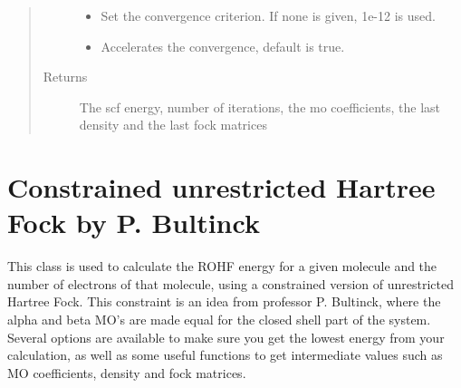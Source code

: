 \documentclass[letterpaper,10pt,english]{sphinxmanual}
\begin{document}
\begin{fulllineitems}
\begin{fulllineitems}
\begin{quote}
\begin{description}
\begin{itemize}
\item {} 
 \textendash{} Set the convergence criterion. If none is given, 1e-12 is used.

\item {} 
 \textendash{} Accelerates the convergence, default is true.

\end{itemize}

\item[{Returns}] \leavevmode
The scf energy, number of iterations, the mo coefficients, the last density and the last fock matrices

\end{description}\end{quote}

\end{fulllineitems}


\end{fulllineitems}

\label{\detokenize{cUHF_b:module-hf.HartreeFock.cUHF_b}}

\chapter{Constrained unrestricted Hartree Fock by P. Bultinck}
\label{\detokenize{cUHF_b:constrained-unrestricted-hartree-fock-by-p-bultinck}}\label{\detokenize{cUHF_b::doc}}
This class is used to calculate the ROHF energy for a given molecule and the number of electrons of that molecule,
using a constrained version of unrestricted Hartree Fock. This constraint is an idea from professor P. Bultinck, where
the alpha and beta MO’s are made equal for the closed shell part of the system.
Several options are available to make sure you get the lowest energy from your calculation, as well as some useful
functions to get intermediate values such as MO coefficients, density and fock matrices.
\end{document}
